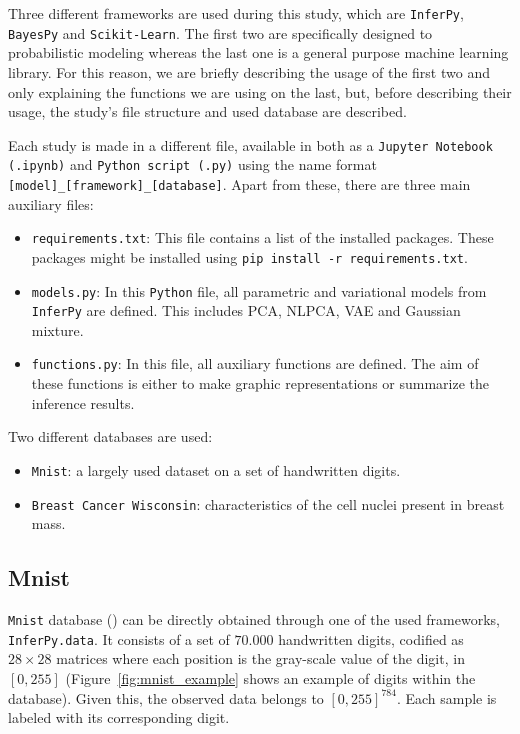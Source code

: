 
Three different frameworks are used during this study, which are \texttt{InferPy}, \texttt{BayesPy} and \texttt{Scikit-Learn}. The first two are specifically designed to probabilistic modeling whereas the last one is a general purpose machine learning library. For this reason, we are briefly describing the usage of the first two and only explaining the functions we are using on the last, but, before describing their usage, the study's file structure and used database are described.

Each study is made in a different file, available in both as a \texttt{Jupyter Notebook (.ipynb)} and \texttt{Python script (.py)} using the name format \texttt{[model]\_[framework]\_[database]}. Apart from these, there are three main auxiliary files:

\begin{itemize}
  \item \texttt{requirements.txt}: This file contains a list of the installed packages. These packages might be installed using \texttt{pip install -r requirements.txt}.
  \item \texttt{models.py}: In this \texttt{Python} file, all parametric and variational models from \texttt{InferPy} are defined. This includes PCA, NLPCA, VAE and Gaussian mixture.
  \item \texttt{functions.py}: In this file, all auxiliary functions are defined. The aim of these functions is either to make graphic representations or summarize the inference results.
\end{itemize}

Two different databases are used:
\begin{itemize}
  \item \texttt{Mnist}: a largely used dataset on a set of handwritten digits.
  \item \texttt{Breast Cancer Wisconsin}: characteristics of the cell nuclei present in breast mass.
\end{itemize}

\subsection{Mnist}

\texttt{Mnist} database (\cite{lecun-mnisthandwrittendigit-2010}) can be directly obtained through one of the used frameworks, \texttt{InferPy.data}. It consists of a set of \(70.000\)  handwritten digits, codified as \(28\times 28\) matrices where each position is the gray-scale value of the digit, in \([0,255]\)  (Figure~\ref{fig:mnist_example} shows an example of digits within the database). Given this, the observed data belongs to \([0, 255]^{784}\). Each sample is labeled with its corresponding digit.

